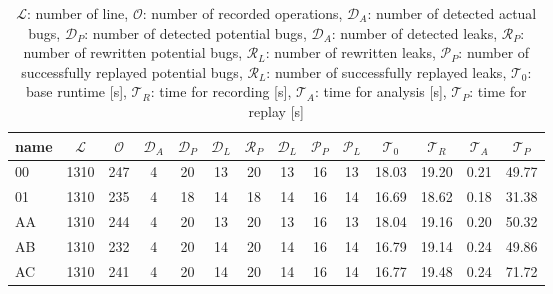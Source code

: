 \begin{table}[h]
\begin{tabular}{|l|c|c|c|c|c|c|c|c|c|c|c|c|c|}
\hline
name  & $\mathcal{L}$ & $\mathcal{O}$ & $\mathcal{D}_A$ & $\mathcal{D}_P$ & $\mathcal{D}_L$ & $\mathcal{R}_P$ & $\mathcal{D}_L$ & $\mathcal{P}_P$ & $\mathcal{P}_L$ & $\mathcal{T}_0$ & $\mathcal{T}_R$ & $\mathcal{T}_A$ & $\mathcal{T}_P$ \\ \hline
00 & 1310 & 247 & 4 & 20 & 13 & 20 & 13 & 16 & 13 & 18.03 & 19.20 & 0.21 & 49.77 \\ \hline
01 & 1310 & 235 & 4 & 18 & 14 & 18 & 14 & 16 & 14 & 16.69 & 18.62 & 0.18 & 31.38 \\ \hline
AA & 1310 & 244 & 4 & 20 & 13 & 20 & 13 & 16 & 13 & 18.04 & 19.16 & 0.20 & 50.32 \\ \hline
AB & 1310 & 232 & 4 & 20 & 14 & 20 & 14 & 16 & 14 & 16.79 & 19.14 & 0.24 & 49.86 \\ \hline
AC & 1310 & 241 & 4 & 20 & 14 & 20 & 14 & 16 & 14 & 16.77 & 19.48 & 0.24 & 71.72 \\ \hline
\end{tabular}
\caption{$\mathcal{L}$: number of line, $\mathcal{O}$: number of recorded operations, $\mathcal{D}_A$: number of detected actual bugs, $\mathcal{D}_P$: number of detected potential bugs, $\mathcal{D}_A$: number of detected leaks, $\mathcal{R}_P$: number of rewritten potential bugs, $\mathcal{R}_L$: number of rewritten leaks, $\mathcal{P}_P$: number of successfully replayed potential bugs, $\mathcal{R}_L$: number of successfully replayed leaks, $\mathcal{T}_0$: base runtime [s], $\mathcal{T}_R$: time for recording [s], $\mathcal{T}_A$: time for analysis [s], $\mathcal{T}_P$: time for replay [s]}
\label{}
\end{table}